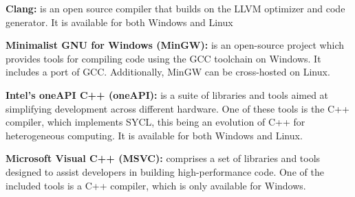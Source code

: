
\noindent\textbf{Clang:} is an open source compiler that builds on the LLVM optimizer and code generator. It is available for both Windows and Linux\cite{clang}\newline

\noindent\textbf{Minimalist GNU for Windows (MinGW):} is an open-source project which provides tools for compiling code using the GCC toolchain on Windows. It includes a port of GCC. Additionally, MinGW can be cross-hosted on Linux.\cite{mingw}\newline

\noindent\textbf{Intel's oneAPI C++ (oneAPI):} is a suite of libraries and tools aimed at simplifying development across different hardware. One of these tools is the C++ compiler, which implements SYCL, this being an evolution of C++ for heterogeneous computing. It is available for both Windows and Linux.\cite{oneapi}\newline

\noindent\textbf{Microsoft Visual C++ (MSVC):}  comprises a set of libraries and tools designed to assist developers in building high-performance code. One of the included tools is a C++ compiler, which is only available for Windows\cite{msvc}.\newline